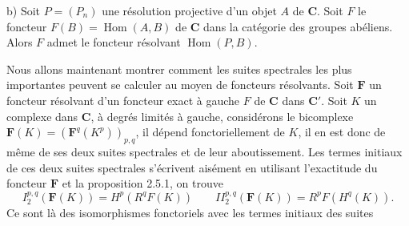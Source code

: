 b) Soit $P=(P_n)$ une résolution projective d'un objet $A$ de $\mathbf{C}$.
Soit $F$ le foncteur $F(B)=\operatorname{Hom}(A,B)$ de $\mathbf{C}$ dans la catégorie
des groupes abéliens. Alors $F$ admet le foncteur résolvant
$\operatorname{Hom}(P,B)$.

Nous allons maintenant montrer comment les suites spectrales les plus
importantes peuvent se calculer au moyen de foncteurs résolvants. Soit
$\mathbf F$ un foncteur résolvant d'un foncteur exact à gauche $F$ de $\mathbf{C}$
dans $\mathbf{C}'$. Soit $K$ un complexe dans $\mathbf{C}$, à degrés limités à gauche,
considérons le bicomplexe
$\mathbf F(K)=(\mathbf F^q(K^p))_{p,q}$, il dépend fonctoriellement de $K$, il
en est donc de même de ses deux suites spectrales et de leur aboutissement.
Les termes initiaux de ces deux suites spectrales s'écrivent aisément en
utilisant l'exactitude du foncteur $\mathbf F$ et la proposition 2.5.1, on
trouve
\[
\tag{2.5.3}
I_2^{p,q}(\mathbf F(K))=H^p(R^qF(K))
\qquad
II_2^{p,q}(\mathbf F(K))=R^pF(H^q(K)).
\]
Ce sont là des isomorphismes fonctoriels avec les termes initiaux des suites


